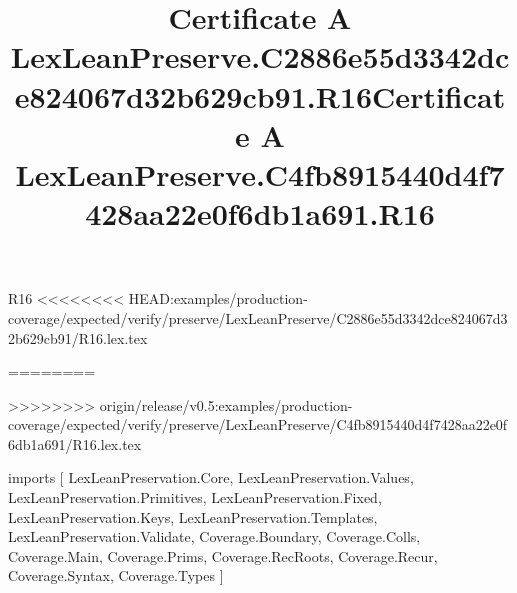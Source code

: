 \begin{lexlean}{R16}
<<<<<<<< HEAD:examples/production-coverage/expected/verify/preserve/LexLeanPreserve/C2886e55d3342dce824067d32b629cb91/R16.lex.tex
\title{Certificate A LexLeanPreserve.C2886e55d3342dce824067d32b629cb91.R16}
========
\title{Certificate A LexLeanPreserve.C4fb8915440d4f7428aa22e0f6db1a691.R16}
>>>>>>>> origin/release/v0.5:examples/production-coverage/expected/verify/preserve/LexLeanPreserve/C4fb8915440d4f7428aa22e0f6db1a691/R16.lex.tex
\begin{coremodule}
imports [
  LexLeanPreservation.Core,
  LexLeanPreservation.Values,
  LexLeanPreservation.Primitives,
  LexLeanPreservation.Fixed,
  LexLeanPreservation.Keys,
  LexLeanPreservation.Templates,
  LexLeanPreservation.Validate,
  Coverage.Boundary,
  Coverage.Colls,
  Coverage.Main,
  Coverage.Prims,
  Coverage.RecRoots,
  Coverage.Recur,
  Coverage.Syntax,
  Coverage.Types
]


\end{coremodule}
\end{lexlean}
